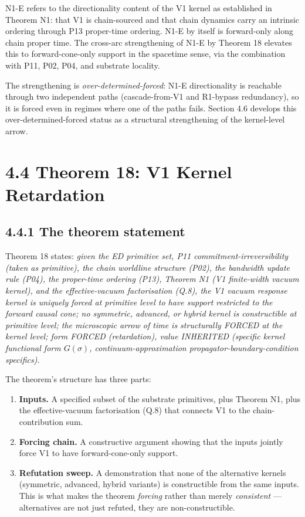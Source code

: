 \documentclass[11pt]{book}
\begin{document}
N1-E refers to the directionality content of the V1 kernel as established in Theorem N1: that V1 is chain-sourced and that chain dynamics carry an intrinsic ordering through P13 proper-time ordering. N1-E by itself is forward-only along chain proper time. The cross-arc strengthening of N1-E by Theorem 18 elevates this to forward-cone-only support in the spacetime sense, via the combination with P11, P02, P04, and substrate locality.

The strengthening is \textit{over-determined-forced}: N1-E directionality is reachable through two independent paths (cascade-from-V1 and R1-bypass redundancy), so it is forced even in regimes where one of the paths fails. Section 4.6 develops this over-determined-forced status as a structural strengthening of the kernel-level arrow.

\section{4.4 Theorem 18: V1 Kernel Retardation}

\subsection{4.4.1 The theorem statement}

Theorem 18 states: \textit{given the ED primitive set, P11 commitment-irreversibility (taken as primitive), the chain worldline structure (P02), the bandwidth update rule (P04), the proper-time ordering (P13), Theorem N1 (V1 finite-width vacuum kernel), and the effective-vacuum factorisation (Q.8), the V1 vacuum response kernel is uniquely forced at primitive level to have support restricted to the forward causal cone; no symmetric, advanced, or hybrid kernel is constructible at primitive level; the microscopic arrow of time is structurally FORCED at the kernel level; form FORCED (retardation), value INHERITED (specific kernel functional form $G(\sigma)$, continuum-approximation propagator-boundary-condition specifics).}

The theorem's structure has three parts:
\begin{enumerate}
\item \textbf{Inputs.} A specified subset of the substrate primitives, plus Theorem N1, plus the effective-vacuum factorisation (Q.8) that connects V1 to the chain-contribution sum.
\item \textbf{Forcing chain.} A constructive argument showing that the inputs jointly force V1 to have forward-cone-only support.
\item \textbf{Refutation sweep.} A demonstration that none of the alternative kernels (symmetric, advanced, hybrid variants) is constructible from the same inputs. This is what makes the theorem \textit{forcing} rather than merely \textit{consistent} — alternatives are not just refuted, they are non-constructible.
\end{enumerate}
\end{document}
